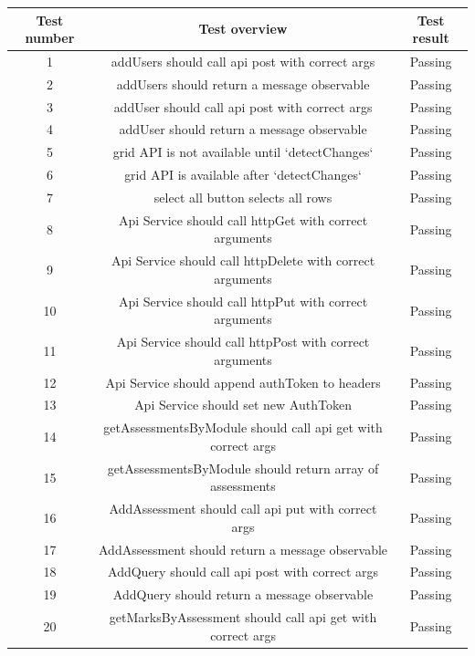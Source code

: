 \documentclass[a4paper,12pt]{article}
\begin{document}
   			\begin{tabular}{ |c|c|c| } 
    			\hline
    			Test number & Test overview & Test result \\
    			\hline
   				1 & addUsers should call api post with correct args & Passing\\
    			\hline
   				2 & addUsers should return a message observable & Passing\\
    			\hline
   				3 & addUser should call api post with correct args & Passing\\
    			\hline
   				4 & addUser should return a message observable & Passing\\
    			\hline
   				5 & grid API is not available until `detectChanges` & Passing\\
    			\hline
   				6 & grid API is available after `detectChanges` & Passing\\
    			\hline
   				7 & select all button selects all rows & Passing\\
    			\hline
   				8 & Api Service should call httpGet with correct arguments & Passing\\
    			\hline
   				9 & Api Service should call httpDelete with correct arguments & Passing\\
    			\hline
   				10 & Api Service should call httpPut with correct arguments & Passing\\
    			\hline
   				11 & Api Service should call httpPost with correct arguments & Passing\\
    			\hline
   				12 & Api Service should append authToken to headers & Passing\\
    			\hline
   				13 & Api Service should set new AuthToken & Passing\\
    			\hline
   				14 & getAssessmentsByModule should call api get with correct args & Passing\\
    			\hline
   				15 & getAssessmentsByModule should return array of assessments & Passing\\
    			\hline
   				16 & AddAssessment should call api put with correct args & Passing\\
    			\hline
   				17 & AddAssessment should return a message observable & Passing\\
    			\hline
   				18 & AddQuery should call api post with correct args & Passing\\
    			\hline
   				19 & AddQuery should return a message observable & Passing\\
    			\hline
   				20 & getMarksByAssessment should call api get with correct args & Passing\\

\end{tabular}
\end{document}
